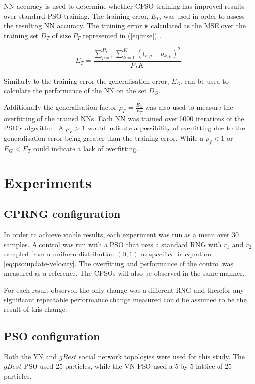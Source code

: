 \documentclass[conference]{IEEEtran}
\begin{document}
\ac{NN} accuracy is used to determine whether \ac{CPSO} training has improved results over standard \ac{PSO} training. The training error, $ E_T $, was used in order to assess the resulting \ac{NN} accuracy. The training error is calculated as the \ac{MSE} over the training set $ D_T $ of size $ P_T $ represented in (\ref{eq:mse}) \cite{vanwyk:overfitting-psoffnn}.

\begin{equation} \label{eq:mse}
E_{T} = \frac{\sum_{p=1}^{P_{T}}\sum_{k=1}^{K}(t_{k,p}-o_{k,p})^{2}}{P_{T}K}
\end{equation}

Similarly to the training error the generalisation error, $ E_G $, can be used to calculate the performance of the \ac{NN} on the set $ D_G $.

Additionally the generalisation factor $ \rho_F = \frac{E_G}{E_T} $ was also used to measure the overfitting of the trained \ac{NN}s. Each \ac{NN} was trained over 5000 iterations of the \ac{PSO}'s algorithm. A $ \rho_F > 1 $ would indicate a possibility of overfitting due to the generalisation error being greater than the training error. While a $ \rho_f < 1 $ or $ E_G < E_T $ could indicate a lack of overfitting.

\section{Experiments}
    \subsection{\ac{CPRNG} configuration}
    In order to achieve viable results, each experiment was run as a mean over 30 samples. A control was run with a \ac{PSO} that uses a standard \ac{RNG} with $r_1$ and $r_2$ sampled from a uniform distribution $ (0, 1) $ as specified in equation \ref{eq:pso:update-velocity}. The overfitting and performance of the control was measured as a reference. The \ac{CPSO}s will also be observed in the same manner.
    
    For each result observed the only change was a different \ac{RNG} and therefor any significant repeatable performance change measured could be assumed to be the result of this change.
    
    \subsection{\ac{PSO} configuration}
    Both the \ac{VN} and $ gBest $ social network topologies were used for this study. The $ gBest $ \ac{PSO} used $ 25 $ particles, while the \ac{VN} \ac{PSO} used a $ 5 $ by $ 5 $ lattice of $ 25 $ particles.
\end{document}
